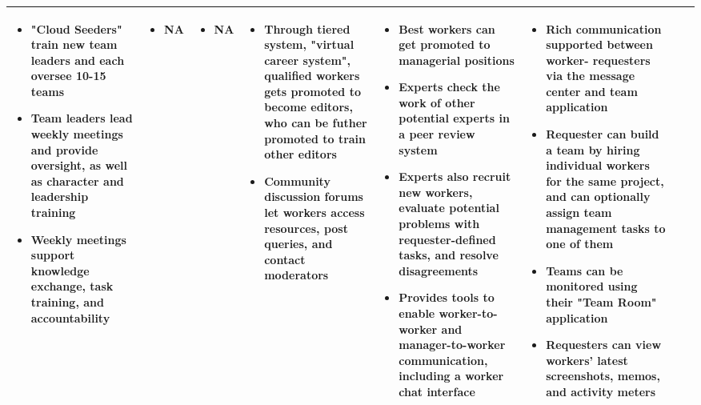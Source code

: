 \documentclass{sigchi}
\begin{document}
\begin{sidewaystable*}
\begin{tabular}[h]{| p{1.5cm}| p{2.7cm}| p{2.7cm}| p{2.7cm}| p{2.7cm}| p{2.7cm}| p{2.7cm}| p{2.7cm}|}
{\begin{itemize} [noitemsep,nolistsep]
\item  "Cloud Seeders" train new team leaders and each oversee 10-15 teams
\item  Team leaders lead weekly meetings and provide oversight, as well as character and leadership training
\item  Weekly meetings support knowledge exchange, task training, and accountability
\end{itemize}
} &
{
\begin{itemize} [noitemsep,nolistsep]
\item NA
\end{itemize}
} &
{
\begin{itemize} [noitemsep,nolistsep]
\item NA
\end{itemize}
} &
{
\begin{itemize} [noitemsep,nolistsep]
\item  Through tiered system, "virtual career system",  qualified workers gets promoted to become editors, who can be futher promoted to train other editors
\item  Community discussion forums let workers access resources, post queries, and contact moderators
\end{itemize}
} &
{
\begin{itemize} [noitemsep,nolistsep]
\item  Best workers can get promoted to managerial positions
\item  Experts check the work of other potential experts in a peer review system
\item  Experts also recruit new workers, evaluate potential problems with requester-defined tasks, and resolve disagreements
\item  Provides tools to enable worker-to-worker and manager-to-worker communication, including a worker chat interface
\end{itemize}
} &
{
\begin{itemize} [noitemsep,nolistsep]
\item  Rich communication supported between worker- requesters via the message center and team application
\item  Requester can build a team by hiring individual workers for the same project, and can optionally assign team management tasks to one of them
\item  Teams can be monitored using their "Team Room" application
\item  Requesters can view workers' latest screenshots, memos, and activity meters
\end{itemize}
} \\ 
\hline


\end{tabular}
\label{Table1}
\end{sidewaystable*}
\end{document}
